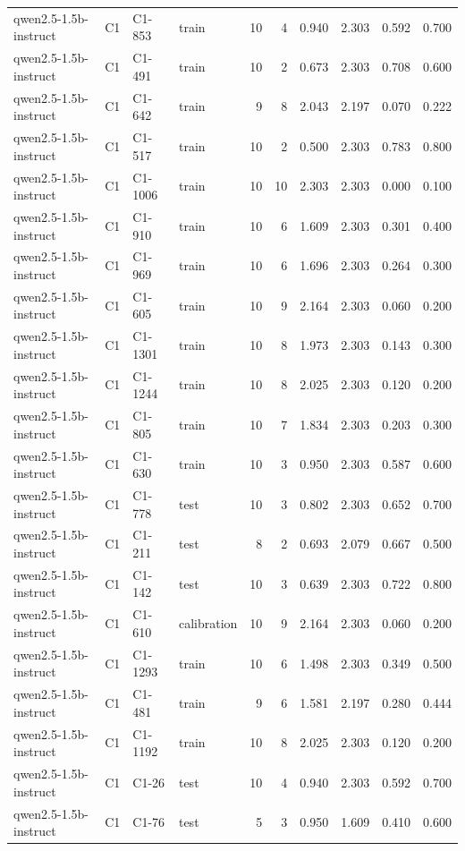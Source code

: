\begin{table}
\begin{tabular}{llllrrrrrr}
qwen2.5-1.5b-instruct & C1 & C1-853 & train & 10 & 4 & 0.940 & 2.303 & 0.592 & 0.700 \\
qwen2.5-1.5b-instruct & C1 & C1-491 & train & 10 & 2 & 0.673 & 2.303 & 0.708 & 0.600 \\
qwen2.5-1.5b-instruct & C1 & C1-642 & train & 9 & 8 & 2.043 & 2.197 & 0.070 & 0.222 \\
qwen2.5-1.5b-instruct & C1 & C1-517 & train & 10 & 2 & 0.500 & 2.303 & 0.783 & 0.800 \\
qwen2.5-1.5b-instruct & C1 & C1-1006 & train & 10 & 10 & 2.303 & 2.303 & 0.000 & 0.100 \\
qwen2.5-1.5b-instruct & C1 & C1-910 & train & 10 & 6 & 1.609 & 2.303 & 0.301 & 0.400 \\
qwen2.5-1.5b-instruct & C1 & C1-969 & train & 10 & 6 & 1.696 & 2.303 & 0.264 & 0.300 \\
qwen2.5-1.5b-instruct & C1 & C1-605 & train & 10 & 9 & 2.164 & 2.303 & 0.060 & 0.200 \\
qwen2.5-1.5b-instruct & C1 & C1-1301 & train & 10 & 8 & 1.973 & 2.303 & 0.143 & 0.300 \\
qwen2.5-1.5b-instruct & C1 & C1-1244 & train & 10 & 8 & 2.025 & 2.303 & 0.120 & 0.200 \\
qwen2.5-1.5b-instruct & C1 & C1-805 & train & 10 & 7 & 1.834 & 2.303 & 0.203 & 0.300 \\
qwen2.5-1.5b-instruct & C1 & C1-630 & train & 10 & 3 & 0.950 & 2.303 & 0.587 & 0.600 \\
qwen2.5-1.5b-instruct & C1 & C1-778 & test & 10 & 3 & 0.802 & 2.303 & 0.652 & 0.700 \\
qwen2.5-1.5b-instruct & C1 & C1-211 & test & 8 & 2 & 0.693 & 2.079 & 0.667 & 0.500 \\
qwen2.5-1.5b-instruct & C1 & C1-142 & test & 10 & 3 & 0.639 & 2.303 & 0.722 & 0.800 \\
qwen2.5-1.5b-instruct & C1 & C1-610 & calibration & 10 & 9 & 2.164 & 2.303 & 0.060 & 0.200 \\
qwen2.5-1.5b-instruct & C1 & C1-1293 & train & 10 & 6 & 1.498 & 2.303 & 0.349 & 0.500 \\
qwen2.5-1.5b-instruct & C1 & C1-481 & train & 9 & 6 & 1.581 & 2.197 & 0.280 & 0.444 \\
qwen2.5-1.5b-instruct & C1 & C1-1192 & train & 10 & 8 & 2.025 & 2.303 & 0.120 & 0.200 \\
qwen2.5-1.5b-instruct & C1 & C1-26 & test & 10 & 4 & 0.940 & 2.303 & 0.592 & 0.700 \\
qwen2.5-1.5b-instruct & C1 & C1-76 & test & 5 & 3 & 0.950 & 1.609 & 0.410 & 0.600 \\

\end{tabular}
\end{table}
